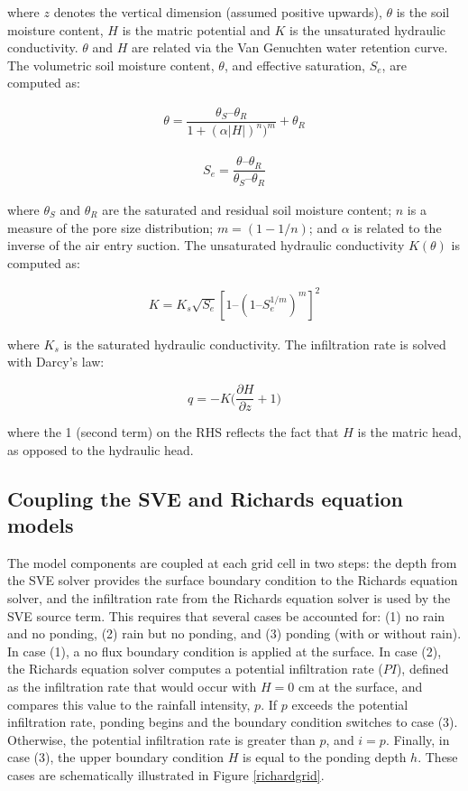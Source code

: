 \documentclass{article}
\begin{document}
\noindent where $z$ denotes the vertical dimension (assumed positive upwards),  $\theta$ is the soil moisture content, $H$ is the matric potential and $K$ is the unsaturated hydraulic conductivity.
 $\theta$ and $H$ are related via the Van Genuchten water retention curve. The volumetric soil moisture content, $\theta$, and effective saturation, $S_e$, are computed as:

\begin{eqnarray} \nonumber
\theta = \dfrac{\theta_S – \theta_R}{1 + (\alpha|H|)^n)^m} + \theta_R
\label{vanG_eqn}
\end{eqnarray}

\begin{eqnarray} \nonumber
S_e = \dfrac{\theta – \theta_R}{\theta_S – \theta_R}
\label{Se}
\end{eqnarray}

 where $\theta_S$ and  $\theta_R$ are the saturated and residual soil moisture content; $n$ is a measure of the pore size distribution; $m=(1-1/n)$; and $\alpha$  is related to the inverse of the air entry suction.  The unsaturated hydraulic conductivity $K(\theta)$ is computed as:

\begin{eqnarray}
K = K_s \sqrt{S_e} [1 – (1 – S_e^{1/m})^m]^2
\label{K}
\end{eqnarray}

where $K_s$ is the saturated hydraulic conductivity.
The infiltration rate is solved with Darcy's law:

\begin{equation}
q =-  K \bigg(\dfrac{\partial H}{\partial z} + 1\bigg)
\label{darcy}
\end{equation}

where the 1  (second term) on the RHS reflects the fact that $H$ is the matric head, as opposed to the hydraulic head.

\subsection{Coupling the SVE and Richards equation models}

The model components are coupled at each grid cell in two steps: the depth from the SVE solver provides the surface boundary condition to the Richards equation solver, and the infiltration rate from the Richards equation solver is used by the SVE source term. This requires that several cases be accounted for: (1) no rain and no ponding, (2) rain but no ponding, and (3)  ponding (with or without rain).   In case (1), a no flux boundary condition is applied at the surface.
 In case (2), the Richards equation solver computes a potential infiltration rate ($PI$), defined as the infiltration rate that would occur with $H=0
 $ cm at the surface, and compares this value to the rainfall intensity, $p$.  If $p$ exceeds the potential infiltration rate, ponding begins and the  boundary condition switches to case (3).  Otherwise, the potential infiltration rate is greater than $p$, and $i=p$. Finally, in case (3), the upper boundary condition $H$ is equal to the ponding depth $h$.  These cases are schematically illustrated in Figure \ref{richardgrid}.
 
\end{document}
